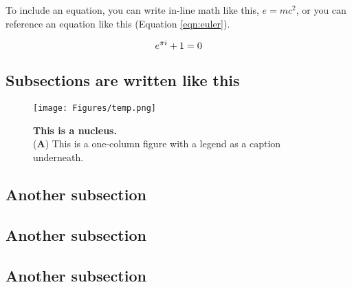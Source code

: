 To include an equation, you can write in-line math like this, $e = mc^2$, or you can reference an equation like this (Equation \ref{eqn:euler}).

\begin{equation}
    \centering
    e^{\pi i} + 1 = 0
    \label{eqn:euler}
\end{equation}

\lipsum[10]

\subsection*{Subsections are written like this}

\lipsum[11]

\begin{figure}
\centering
\texttt{[image: Figures/temp.png]}
\caption{\textbf{This is a nucleus.}\\
(\textbf{A}) This is a one-column figure with a legend as a caption underneath.}
\label{fig:nucleus}
\end{figure}

\lipsum[12]

\subsection*{Another subsection}

\lipsum[13-14]

\subsection*{Another subsection}

\lipsum[13-14]

\subsection*{Another subsection}

\lipsum[13-14]
